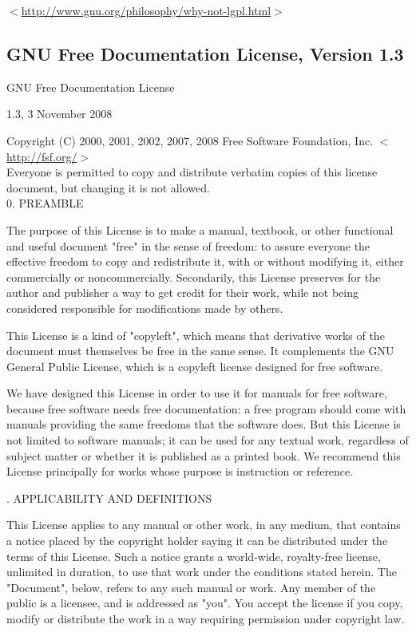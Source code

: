 $<$\href{http://www.gnu.org/philosophy/why-not-lgpl.html}{http://www.gnu.org/philosophy/why-not-lgpl.html}$>$ 


\newpage

\subsection{GNU Free Documentation License, Version 1.3}
\label{GNUFDL}
\begin{center}
	GNU Free Documentation License
	
	1.3, 3 November 2008
\end{center}

\noindent Copyright (C) 2000, 2001, 2002, 2007, 2008 Free Software Foundation, Inc.  $<$\href{http://fsf.org/}{http://fsf.org/}$>$ \\

\noindent Everyone is permitted to copy and distribute verbatim copies
of this license document, but changing it is not allowed. \\



0. PREAMBLE

The purpose of this License is to make a manual, textbook, or other functional and useful document "free" in the sense of freedom: to assure everyone the effective freedom to copy and redistribute it, with or without modifying it, either commercially or noncommercially. Secondarily, this License preserves for the author and publisher a way to get credit for their work, while not being considered responsible for modifications made by others.

This License is a kind of "copyleft", which means that derivative works of the document must themselves be free in the same sense. It complements the GNU General Public License, which is a copyleft license designed for free software.

We have designed this License in order to use it for manuals for free software, because free software needs free documentation: a free program should come with manuals providing the same freedoms that the software does. But this License is not limited to software manuals; it can be used for any textual work, regardless of subject matter or whether it is published as a printed book. We recommend this License principally for works whose purpose is instruction or reference.

. APPLICABILITY AND DEFINITIONS


This License applies to any manual or other work, in any medium, that contains a notice placed by the copyright holder saying it can be distributed under the terms of this License. Such a notice grants a world-wide, royalty-free license, unlimited in duration, to use that work under the conditions stated herein. The "Document", below, refers to any such manual or work. Any member of the public is a licensee, and is addressed as "you". You accept the license if you copy, modify or distribute the work in a way requiring permission under copyright law.

